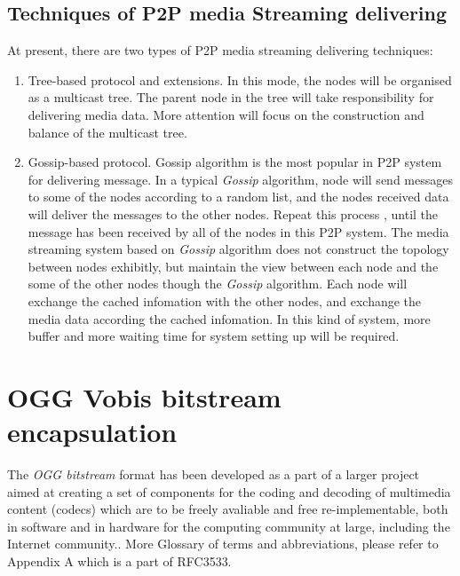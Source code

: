 \subsection{Techniques of P2P media Streaming delivering}
{
 At present, there are two types of P2P media streaming delivering techniques:
\begin{enumerate}
\setcounter{enumi}{0}
\item Tree-based protocol and extensions. In this mode, the nodes will be organised as a multicast tree. The parent node in the tree will take responsibility for delivering media data. More attention will focus on the construction and balance of the multicast tree.
\item Gossip-based protocol. Gossip algorithm is the most popular in P2P system for delivering message. In a typical \emph{Gossip} algorithm, node will send messages to some of the nodes according to a random list, and the nodes received data will deliver the messages to the other nodes. Repeat this process , until the message has been received by all of the nodes in this P2P system. 
The media streaming system based on \emph{Gossip} algorithm does not construct the topology between nodes exhibitly, but maintain the view between each node and the some of the other nodes though the \emph{Gossip} algorithm. 
Each node will exchange the cached infomation with the other nodes, and exchange the media data according the cached infomation. In this kind of system, more buffer and more waiting time for system setting up will be required.
\end{enumerate}
}

\section{OGG Vobis bitstream encapsulation}
{
  The \emph{OGG bitstream} format has been developed as a part of a larger project aimed at creating a set of components for the coding and decoding of multimedia content (codecs) which are to be freely avaliable and free re-implementable, both in software and in hardware for the computing community at large, including the Internet community.\cite{oggencapsulationformat}. More Glossary of terms and abbreviations, please refer to Appendix A which is a part of RFC3533.
}
